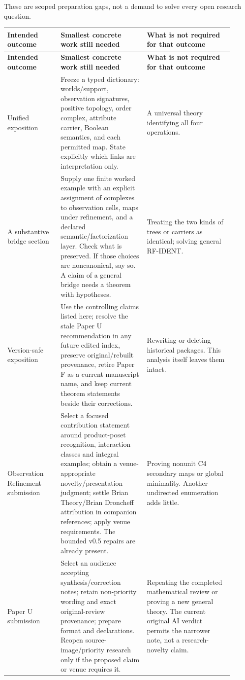 \documentclass[10pt,letterpaper]{article}
\begin{document}
These are scoped preparation gaps, not a demand to solve every open research question.\par

\begingroup
\footnotesize
\setlength{\tabcolsep}{4pt}
\renewcommand{\arraystretch}{1.12}
\begin{longtable}{@{}P{0.210\linewidth}P{0.348\linewidth}P{0.348\linewidth}@{}}
\hline
\textbf{Intended outcome} & \textbf{Smallest concrete work still needed} & \textbf{What is not required for that outcome} \\ \hline
\endfirsthead
\hline
\textbf{Intended outcome} & \textbf{Smallest concrete work still needed} & \textbf{What is not required for that outcome} \\ \hline
\endhead
Unified exposition & Freeze a typed dictionary: worlds/support, observation signatures, positive topology, order complex, attribute carrier, Boolean semantics, and each permitted map. State explicitly which links are interpretation only. & A universal theory identifying all four operations. \\ \hline
A substantive bridge section & Supply one finite worked example with an explicit assignment of complexes to observation cells, maps under refinement, and a declared semantic/factorization layer. Check what is preserved. If those choices are noncanonical, say so. A claim of a general bridge needs a theorem with hypotheses. & Treating the two kinds of trees or carriers as identical; solving general RF-IDENT. \\ \hline
Version-safe exposition & Use the controlling claims listed here; resolve the stale Paper U recommendation in any future edited index, preserve original/rebuilt provenance, retire Paper F as a current manuscript name, and keep current theorem statements beside their corrections. & Rewriting or deleting historical packages. This analysis itself leaves them intact. \\ \hline
Observation Refinement submission & Select a focused contribution statement around product-poset recognition, interaction classes and integral examples; obtain a venue-appropriate novelty/presentation judgment; settle Brian Theory/Brian Droncheff attribution in companion references; apply venue requirements. The bounded v0.5 repairs are already present. & Proving nonunit C4 secondary maps or global minimality. Another undirected enumeration adds little. \\ \hline
Paper U submission & Select an audience accepting synthesis/correction notes; retain non-priority wording and exact original-review provenance; prepare format and declarations. Reopen source-image/priority research only if the proposed claim or venue requires it. & Repeating the completed mathematical review or proving a new general theory. The current original AI verdict permits the narrower note, not a research-novelty claim. \\ \hline

\end{longtable}
\end{document}
